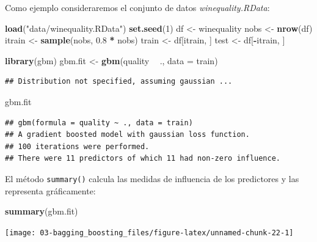 \documentclass[
]{book}
\newenvironment{Shaded}{\begin{snugshade}}{\end{snugshade}}
\newcommand{\DataTypeTok}[1]{\textcolor[rgb]{0.13,0.29,0.53}{#1}}
\newcommand{\DecValTok}[1]{\textcolor[rgb]{0.00,0.00,0.81}{#1}}
\newcommand{\FloatTok}[1]{\textcolor[rgb]{0.00,0.00,0.81}{#1}}
\newcommand{\KeywordTok}[1]{\textcolor[rgb]{0.13,0.29,0.53}{\textbf{#1}}}
\newcommand{\NormalTok}[1]{#1}
\newcommand{\OperatorTok}[1]{\textcolor[rgb]{0.81,0.36,0.00}{\textbf{#1}}}
\newcommand{\StringTok}[1]{\textcolor[rgb]{0.31,0.60,0.02}{#1}}
\theoremstyle{break}
\theoremstyle{definition}
\theoremstyle{definition}
\theoremstyle{definition}
\theoremstyle{remark}
\begin{document}
Como ejemplo consideraremos el conjunto de datos \emph{winequality.RData}:

\begin{Shaded}
\begin{Highlighting}[]
\KeywordTok{load}\NormalTok{(}\StringTok{"data/winequality.RData"}\NormalTok{)}
\KeywordTok{set.seed}\NormalTok{(}\DecValTok{1}\NormalTok{)}
\NormalTok{df <-}\StringTok{ }\NormalTok{winequality}
\NormalTok{nobs <-}\StringTok{ }\KeywordTok{nrow}\NormalTok{(df)}
\NormalTok{itrain <-}\StringTok{ }\KeywordTok{sample}\NormalTok{(nobs, }\FloatTok{0.8} \OperatorTok{*}\StringTok{ }\NormalTok{nobs)}
\NormalTok{train <-}\StringTok{ }\NormalTok{df[itrain, ]}
\NormalTok{test <-}\StringTok{ }\NormalTok{df[}\OperatorTok{-}\NormalTok{itrain, ]}

\KeywordTok{library}\NormalTok{(gbm)}
\NormalTok{gbm.fit <-}\StringTok{ }\KeywordTok{gbm}\NormalTok{(quality }\OperatorTok{~}\StringTok{ }\NormalTok{., }\DataTypeTok{data =}\NormalTok{ train)}
\end{Highlighting}
\end{Shaded}

\begin{verbatim}
## Distribution not specified, assuming gaussian ...
\end{verbatim}

\begin{Shaded}
\begin{Highlighting}[]
\NormalTok{gbm.fit}
\end{Highlighting}
\end{Shaded}

\begin{verbatim}
## gbm(formula = quality ~ ., data = train)
## A gradient boosted model with gaussian loss function.
## 100 iterations were performed.
## There were 11 predictors of which 11 had non-zero influence.
\end{verbatim}

El método \texttt{summary()} calcula las medidas de influencia de los predictores y las representa gráficamente:

\begin{Shaded}
\begin{Highlighting}[]
\KeywordTok{summary}\NormalTok{(gbm.fit)}
\end{Highlighting}
\end{Shaded}

\begin{center}\texttt{[image: 03-bagging\_boosting\_files/figure-latex/unnamed-chunk-22-1]} \end{center}
\end{document}
